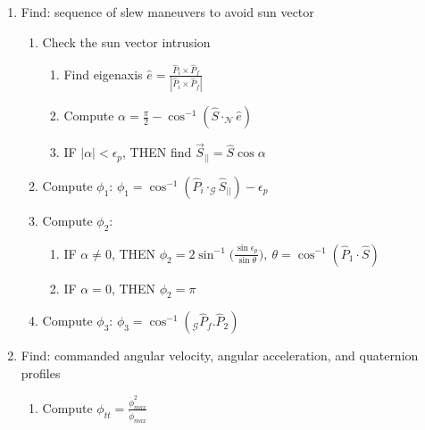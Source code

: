 \documentclass[letterpaper, preprint, paper,11pt]{AAS}	%
\begin{document}
	\begin{enumerate}
		
		\item Find: sequence of slew maneuvers to avoid sun vector 
		
		\begin{enumerate}
			
			\item Check the sun vector intrusion 
			
			\begin{enumerate}
				\item Find eigenaxis $
				\hat{e}=\frac{\hat{P}_i\times\hat{P}_f}{|\hat{P}_i\times \hat{P}_f|}
				$
				\item Compute $
				\alpha=\frac{\pi}{2}-\cos^{-1}(\hat{S}\cdot_\mathcal{N}\hat{e})
				$
				\item IF $|\alpha|<\epsilon_p$, THEN find 
				$
				\vec{S}_{||}=\hat{S}\cos\alpha
				$
			\end{enumerate}
			
			\item Compute $\phi_1$:
			$
			\phi_1 = \cos^{-1}(\hat{P}_i\cdot_\mathcal{G}\hat{S}_{||})-\epsilon_p
			$
			
			\item Compute $\phi_2$:
			
			\begin{enumerate}
				\item IF $\alpha \neq 0$, THEN
				$
				\phi_2 = 2\sin^{-1}\Big( \frac{ \sin\epsilon_p}{\sin \theta}\Big),\ \theta=\cos^{-1}(\hat{P}_1\cdot\hat{S})
				$
				
				\item IF $\alpha = 0$, THEN
				$
				\phi_2 = \pi
				$
				
			\end{enumerate}
			
			\item Compute $\phi_3$:
			$
			\phi_3 = \cos^{-1}(_\mathcal{G}\hat{P}_f.\hat{P}_2)
			$
			
		\end{enumerate}
		
		\item Find: commanded angular velocity, angular acceleration, and quaternion profiles 
		
		\begin{enumerate}
			
			\item Compute $\phi_{tt} = \frac{\dot{\phi}_{max}^2}{\ddot{\phi}_{max}}$
			

\end{enumerate}
\end{enumerate}
\end{document}
